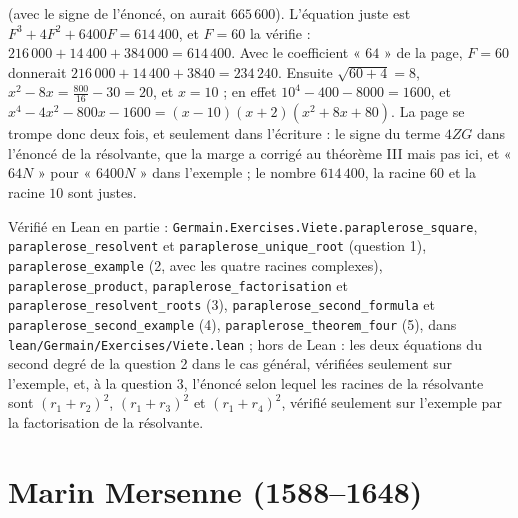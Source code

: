 \documentclass[11pt,a4paper]{article}
\begin{document}
\begin{solution}
\begin{enumerate}
  (avec le signe de l'énoncé, on aurait $665\,600$). L'équation juste est
  $F^3 + 4F^2 + 6400F = 614\,400$, et $F = 60$ la vérifie :
  $216\,000 + 14\,400 + 384\,000 = 614\,400$. Avec le coefficient « $64$ » de la
  page, $F = 60$ donnerait $216\,000 + 14\,400 + 3840 = 234\,240$. Ensuite
  $\sqrt{60 + 4} = 8$, $x^2 - 8x = \frac{800}{16} - 30 = 20$, et $x = 10$ ; en effet
  $10^4 - 400 - 8000 = 1600$, et
  $x^4 - 4x^2 - 800x - 1600 = (x - 10)(x + 2)(x^2 + 8x + 80)$. La page se trompe
  donc deux fois, et seulement dans l'écriture : le signe du terme $4ZG$ dans
  l'énoncé de la résolvante, que la marge a corrigé au théorème III mais pas ici,
  et « $64N$ » pour « $6400N$ » dans l'exemple ; le nombre $614\,400$, la racine $60$
  et la racine $10$ sont justes.
\end{enumerate}

Vérifié en Lean en partie : \texttt{Germain.Exercises.Viete.paraplerose\_square},
\texttt{paraplerose\_resolvent} et \texttt{paraplerose\_unique\_root} (question 1),
\texttt{paraplerose\_example} (2, avec les quatre racines complexes),
\texttt{paraplerose\_product}, \texttt{paraplerose\_factorisation} et
\texttt{paraplerose\_resolvent\_roots} (3), \texttt{paraplerose\_second\_formula} et
\texttt{paraplerose\_second\_example} (4), \texttt{paraplerose\_theorem\_four} (5), dans
\texttt{lean/Germain/Exercises/Viete.lean} ; hors de Lean : les deux équations du second degré de la question 2 dans
le cas général, vérifiées seulement sur l'exemple, et, à la question 3, l'énoncé selon lequel
les racines de la résolvante sont $(r_1 + r_2)^2$, $(r_1 + r_3)^2$ et $(r_1 + r_4)^2$, vérifié
seulement sur l'exemple par la factorisation de la résolvante.
\end{solution}

\section*{Marin Mersenne (1588--1648)}
\end{document}
